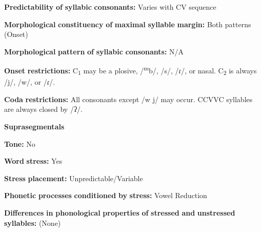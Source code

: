 \begin{styleBody}
\textbf{Predictability} \textbf{of} \textbf{syllabic} \textbf{consonants:} Varies with CV sequence
\end{styleBody}

\begin{styleBody}
\textbf{Morphological} \textbf{constituency} \textbf{of} \textbf{maximal} \textbf{syllable} \textbf{margin:} Both patterns (Onset)
\end{styleBody}

\begin{styleBody}
\textbf{Morphological} \textbf{pattern} \textbf{of} \textbf{syllabic} \textbf{consonants:} N/A
\end{styleBody}

\begin{styleBody}
\textbf{Onset} \textbf{restrictions:} C\textsubscript{1} may be a plosive, /\textsuperscript{m}b/, /s/, /ɾ/, or nasal. C\textsubscript{2} is always /j/, /w/, or /ɾ/.
\end{styleBody}

\begin{styleBody}
\textbf{Coda} \textbf{restrictions:} All consonants except /w j/ may occur. CCVVC syllables are always closed by /ʔ/.
\end{styleBody}

\begin{styleBody}
\textbf{Suprasegmentals}
\end{styleBody}

\begin{styleBody}
\textbf{Tone:} No
\end{styleBody}

\begin{styleBody}
\textbf{Word} \textbf{stress:} Yes
\end{styleBody}

\begin{styleBody}
\textbf{Stress} \textbf{placement:} Unpredictable/Variable
\end{styleBody}

\begin{styleBody}
\textbf{Phonetic} \textbf{processes} \textbf{conditioned} \textbf{by} \textbf{stress:} Vowel Reduction
\end{styleBody}

\begin{styleBody}
\textbf{Differences} \textbf{in} \textbf{phonological} \textbf{properties} \textbf{of} \textbf{stressed} \textbf{and} \textbf{unstressed} \textbf{syllables:} (None)
\end{styleBody}

